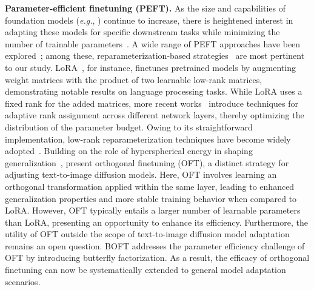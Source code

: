 \textbf{Parameter-efficient finetuning (PEFT).} As the size and capabilities of foundation models (\emph{e.g.}, \cite{brown2020language,radford2021learning,rombach2022high,kirillov2023segment}) continue to increase, there is heightened interest in adapting these models for specific downstream tasks while minimizing the number of trainable parameters~\cite{treviso2023efficient,ding2023parameter,lialin2023scaling}. A wide range of PEFT approaches have been explored~\cite{houlsby2019parameter,aghajanyan2020intrinsic,hulora2022,edalati2022krona,wang2022adamix,gheini2021cross,zaken2022bitfit,guo2020parameter,sung2021training,ansell2022composable,lester2021power,li2021prefix,vu2022spot,he2021towards,mao2021unipelt,karimi2021compacter,liu2022few,sung2022lst,chen2022parameter,jia2022visual,chen2022adaptformer,zhang2022neural,jie2023fact,lian2022scaling,luo2023towards}; among these, reparameterization-based strategies~\cite{aghajanyan2020intrinsic,hulora2022,edalati2022krona} are most pertinent to our study. LoRA~\cite{hulora2022}, for instance, finetunes pretrained models by augmenting weight matrices with the product of two learnable low-rank matrices, demonstrating notable results on language processing tasks. While LoRA uses a fixed rank for the added matrices, more recent works~\cite{zhang2022adaptive,valipour2022dylora,zhang2023increlora} introduce techniques for adaptive rank assignment across different network layers, thereby optimizing the distribution of the parameter budget. Owing to its straightforward implementation, low-rank reparameterization techniques have become widely adopted~\cite{dettmers2023qlora,zi2023delta,chavan2023one}. Building on the role of hyperspherical energy in shaping generalization~\cite{liu2018learning,liu2021orthogonal}, \cite{qiu2023controlling} present orthogonal finetuning (OFT), a distinct strategy for adjusting text-to-image diffusion models. Here, OFT involves learning an orthogonal transformation applied within the same layer, leading to enhanced generalization properties and more stable training behavior when compared to LoRA. However, OFT typically entails a larger number of learnable parameters than LoRA, presenting an opportunity to enhance its efficiency. Furthermore, the utility of OFT outside the scope of text-to-image diffusion model adaptation~\cite{qiu2023controlling} remains an open question. BOFT addresses the parameter efficiency challenge of OFT by introducing butterfly factorization. As a result, the efficacy of orthogonal finetuning can now be systematically extended to general model adaptation scenarios.

